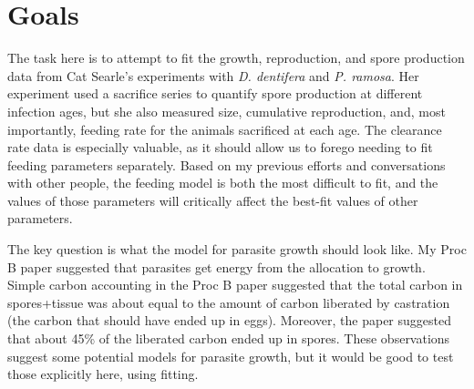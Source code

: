 \documentclass[11pt,reqno,final,pdftex]{amsart}\usepackage[]{graphicx}\usepackage[]{color}
\theoremstyle{plain}
\numberwithin{equation}{part}
\begin{document}
\section*{Goals}
The task here is to attempt to fit the growth, reproduction, and spore production data from Cat Searle's experiments with \emph{D. dentifera} and \emph{P. ramosa}.
Her experiment used a sacrifice series to quantify spore production at different infection ages, but she also measured size, cumulative reproduction, and, most importantly, feeding rate for the animals sacrificed at each age.
The clearance rate data is especially valuable, as it should allow us to forego needing to fit feeding parameters separately.
Based on my previous efforts and conversations with other people, the feeding model is both the most difficult to fit, and the values of those parameters will critically affect the best-fit values of other parameters.

The key question is what the model for parasite growth should look like.
My Proc B paper suggested that parasites get energy from the allocation to growth.
Simple carbon accounting in the Proc B paper suggested that the total carbon in spores+tissue was about equal to the amount of carbon liberated by castration (the carbon that should have ended up in eggs).
Moreover, the paper suggested that about 45\% of the liberated carbon ended up in spores.
These observations suggest some potential models for parasite growth, but it would be good to test those explicitly here, using fitting.
\end{document}
